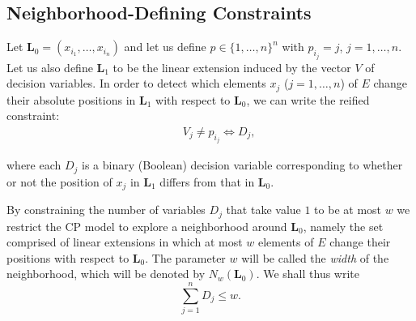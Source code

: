 \documentclass{llncs}
\begin{document}
\subsection{Neighborhood-Defining Constraints}

Let $\mathbf{L}_0=\left(x_{i_1}, \ldots, x_{i_n}\right)$ and let us define $p \in \{1,\ldots,n\}^n$ with $p_{i_j}=j$, $j=1,\ldots,n$. Let us also define $\mathbf{L}_1$ to be the linear extension induced by the vector $V$ of decision variables. In order to detect which elements $x_j$ ($j=1,\ldots,n$) of $E$ change their absolute positions in $\mathbf{L}_1$ with respect to $\mathbf{L}_0$, we can write the reified constraint:
\begin{eqnarray}
&& V_j \neq p_{i_j} \Leftrightarrow D_j,
\end{eqnarray}

\noindent where each $D_j$ is a binary (Boolean) decision variable corresponding to whether or not the position of $x_j$ in $\mathbf{L}_1$ differs from that in $\mathbf{L}_0$.

By constraining the number of variables $D_j$ that take value $1$ to be at most $w$ we restrict the CP model to explore a neighborhood around $\mathbf{L}_0$, namely the set comprised of linear extensions in which at most $w$ elements of $E$ change their positions with respect to $\mathbf{L}_0$. The parameter $w$ will be called the \emph{width} of the neighborhood, which will be denoted by $N_w(\mathbf{L}_0)$. We shall thus write
\begin{equation}
\sum_{j=1}^n D_j \leq w.
\end{equation}
\end{document}
